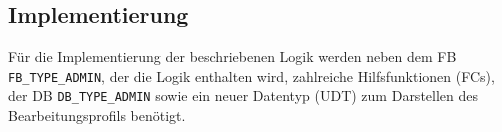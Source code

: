 


\subsection{Implementierung}
\label{subsec:ips_l_implementation}

Für die Implementierung der beschriebenen Logik werden neben dem FB \texttt{FB\_TYPE\_ADMIN}, der die Logik enthalten wird, zahlreiche Hilfsfunktionen (FCs), der DB \texttt{DB\_TYPE\_ADMIN} sowie ein neuer Datentyp (UDT) zum Darstellen des Bearbeitungsprofils benötigt.


